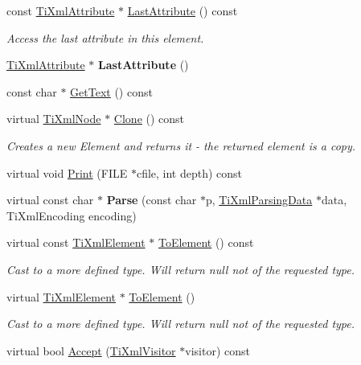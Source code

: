 \begin{DoxyCompactItemize}
const \hyperlink{class_ti_xml_attribute}{Ti\+Xml\+Attribute} $\ast$ \hyperlink{class_ti_xml_element_a42939f55ed4cec5fc1daaecfded7ba16}{Last\+Attribute} () const
\begin{DoxyCompactList}\small\item\em Access the last attribute in this element. \end{DoxyCompactList}\item 
\hypertarget{class_ti_xml_element_a222f81cf06155cd108f2a68d4d176004}{}\label{class_ti_xml_element_a222f81cf06155cd108f2a68d4d176004} 
\hyperlink{class_ti_xml_attribute}{Ti\+Xml\+Attribute} $\ast$ {\bfseries Last\+Attribute} ()
\item 
const char $\ast$ \hyperlink{class_ti_xml_element_af0f814ecbd43d50d4cdbdf4354d3da39}{Get\+Text} () const
\item 
\hypertarget{class_ti_xml_element_a810ea8fa40844c01334e5af2a26794cb}{}\label{class_ti_xml_element_a810ea8fa40844c01334e5af2a26794cb} 
virtual \hyperlink{class_ti_xml_node}{Ti\+Xml\+Node} $\ast$ \hyperlink{class_ti_xml_element_a810ea8fa40844c01334e5af2a26794cb}{Clone} () const
\begin{DoxyCompactList}\small\item\em Creates a new Element and returns it -\/ the returned element is a copy. \end{DoxyCompactList}\item 
virtual void \hyperlink{class_ti_xml_element_aa31a15cddfb8601a31236fe7d2569fb4}{Print} (F\+I\+LE $\ast$cfile, int depth) const
\item 
\hypertarget{class_ti_xml_element_af95c9165159fd9dfdcc5b894a3fcf85b}{}\label{class_ti_xml_element_af95c9165159fd9dfdcc5b894a3fcf85b} 
virtual const char $\ast$ {\bfseries Parse} (const char $\ast$p, \hyperlink{class_ti_xml_parsing_data}{Ti\+Xml\+Parsing\+Data} $\ast$data, Ti\+Xml\+Encoding encoding)
\item 
\hypertarget{class_ti_xml_element_a940fc8aa953e0ef0de6e110b7d98b8ee}{}\label{class_ti_xml_element_a940fc8aa953e0ef0de6e110b7d98b8ee} 
virtual const \hyperlink{class_ti_xml_element}{Ti\+Xml\+Element} $\ast$ \hyperlink{class_ti_xml_element_a940fc8aa953e0ef0de6e110b7d98b8ee}{To\+Element} () const
\begin{DoxyCompactList}\small\item\em Cast to a more defined type. Will return null not of the requested type. \end{DoxyCompactList}\item 
\hypertarget{class_ti_xml_element_a9def86337ea7a755eb41cac980f60c7a}{}\label{class_ti_xml_element_a9def86337ea7a755eb41cac980f60c7a} 
virtual \hyperlink{class_ti_xml_element}{Ti\+Xml\+Element} $\ast$ \hyperlink{class_ti_xml_element_a9def86337ea7a755eb41cac980f60c7a}{To\+Element} ()
\begin{DoxyCompactList}\small\item\em Cast to a more defined type. Will return null not of the requested type. \end{DoxyCompactList}\item 
virtual bool \hyperlink{class_ti_xml_element_a01d33358cce9d1817b557d314dda3779}{Accept} (\hyperlink{class_ti_xml_visitor}{Ti\+Xml\+Visitor} $\ast$visitor) const
\end{DoxyCompactItemize}
